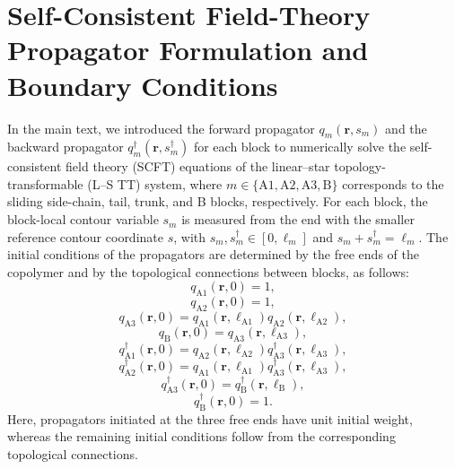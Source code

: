 \documentclass[journal=mamobx,manuscript=article]{achemso}
\begin{document}
\section{Self-Consistent Field-Theory Propagator Formulation and Boundary Conditions}\label{sec:Propagator}
	In the main text, we introduced the forward propagator $q_m(\bm r,s_m)$ and the backward propagator $q_m^\dagger(\bm r,s^\dagger_m)$ for each block to numerically solve the self-consistent field theory (SCFT) equations of the linear--star topology-transformable (L--S TT) system, where $m\in\{\mathrm{A1},\mathrm{A2},\mathrm{A3},\mathrm{B}\}$ corresponds to the sliding side-chain, tail, trunk, and B blocks, respectively.
	For each block, the block-local contour variable $s_m$ is measured from the end with the smaller reference contour coordinate $s$, with $s_m, s^\dagger_m \in [0,\ell_m]$ and $s_m+s^\dagger_m=\ell_m$.
	The initial conditions of the propagators are determined by the free ends of the copolymer and by the topological connections between blocks, as follows:
	\begin{equation}
		q_{\mathrm{A1}}(\bm r,0)=1,
	\end{equation}
	\begin{equation}
		q_{\mathrm{A2}}(\bm r,0)=1,
	\end{equation}
	\begin{equation}
		q_{\mathrm{A3}}(\bm r,0)=
		q_{\mathrm{A1}}(\bm r,\ell_{\mathrm{A1}})
		q_{\mathrm{A2}}(\bm r,\ell_{\mathrm{A2}}),
	\end{equation}
	\begin{equation}
		q_{\mathrm{B}}(\bm r,0)=q_{\mathrm{A3}}(\bm r, \ell_{\mathrm{A3}}),
	\end{equation}
	\begin{equation}
		q^\dagger_{\mathrm{A1}}(\bm r,0)=
		q_{\mathrm{A2}}(\bm r,\ell_{\mathrm{A2}})
		q^\dagger_{\mathrm{A3}}(\bm r,\ell_{\mathrm{A3}}),
	\end{equation}
	\begin{equation}
		q^\dagger_{\mathrm{A2}}(\bm r,0)=
		q_{\mathrm{A1}}(\bm r,\ell_{\mathrm{A1}})
		q^\dagger_{\mathrm{A3}}(\bm r,\ell_{\mathrm{A3}}),
	\end{equation}
	\begin{equation}
		q^\dagger_{\mathrm{A3}}(\bm r,0)=
		q^\dagger_{\mathrm B}(\bm r,\ell_{\mathrm{B}}),
	\end{equation}
	\begin{equation}
		q^\dagger_{\mathrm{B}}(\bm r,0)=1.
	\end{equation}
	Here, propagators initiated at the three free ends have unit initial weight, whereas the remaining initial conditions follow from the corresponding topological connections.
\end{document}
